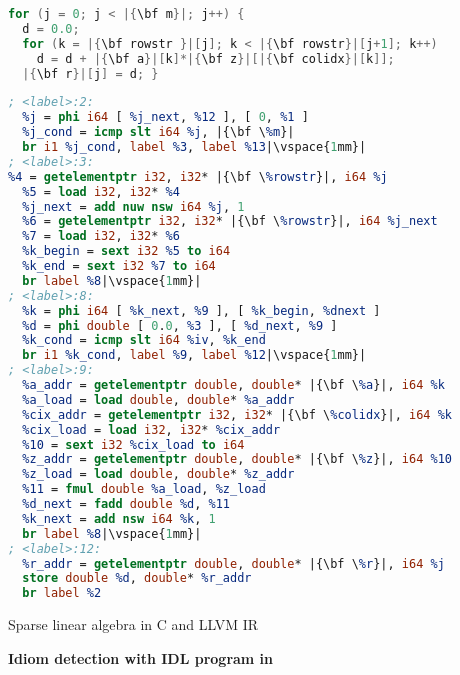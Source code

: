 \begin{lstlisting}[escapechar=|,language=C]
for (j = 0; j < |{\bf m}|; j++) {
  d = 0.0;
  for (k = |{\bf rowstr }|[j]; k < |{\bf rowstr}|[j+1]; k++)
    d = d + |{\bf a}|[k]*|{\bf z}|[|{\bf colidx}|[k]];
  |{\bf r}|[j] = d; }
\end{lstlisting}
\vspace{-1em}
\begin{lstlisting}[escapechar=|,language={LLVM},basicstyle=\linespread{0.939}\tiny\ttfamily]
; <label>:2:
  %j = phi i64 [ %j_next, %12 ], [ 0, %1 ]
  %j_cond = icmp slt i64 %j, |{\bf \%m}|
  br i1 %j_cond, label %3, label %13|\vspace{1mm}|
; <label>:3:
%4 = getelementptr i32, i32* |{\bf \%rowstr}|, i64 %j
  %5 = load i32, i32* %4
  %j_next = add nuw nsw i64 %j, 1
  %6 = getelementptr i32, i32* |{\bf \%rowstr}|, i64 %j_next
  %7 = load i32, i32* %6
  %k_begin = sext i32 %5 to i64
  %k_end = sext i32 %7 to i64
  br label %8|\vspace{1mm}|
; <label>:8:
  %k = phi i64 [ %k_next, %9 ], [ %k_begin, %dnext ]
  %d = phi double [ 0.0, %3 ], [ %d_next, %9 ]
  %k_cond = icmp slt i64 %iv, %k_end
  br i1 %k_cond, label %9, label %12|\vspace{1mm}|
; <label>:9:
  %a_addr = getelementptr double, double* |{\bf \%a}|, i64 %k
  %a_load = load double, double* %a_addr
  %cix_addr = getelementptr i32, i32* |{\bf \%colidx}|, i64 %k
  %cix_load = load i32, i32* %cix_addr
  %10 = sext i32 %cix_load to i64
  %z_addr = getelementptr double, double* |{\bf \%z}|, i64 %10
  %z_load = load double, double* %z_addr
  %11 = fmul double %a_load, %z_load
  %d_next = fadd double %d, %11
  %k_next = add nsw i64 %k, 1
  br label %8|\vspace{1mm}|
; <label>:12:
  %r_addr = getelementptr double, double* |{\bf \%r}|, i64 %j
  store double %d, double* %r_addr
  br label %2
\end{lstlisting}
\vspace{-0.287cm}
\caption{Sparse linear algebra in C and LLVM IR}
\label{fig:spmvexample1}

\centering
\vspace{0.0em}
{\centering
\begin{minipage}{0.05\linewidth}
\vspace{0pt}
\centering
{}
\end{minipage}
\begin{minipage}{\linewidth}
\centering
\textbf{Idiom detection with IDL program in }
\end{minipage}
\begin{minipage}{0.05\linewidth}
\vspace{0pt}
\centering
{}
\end{minipage}
}

